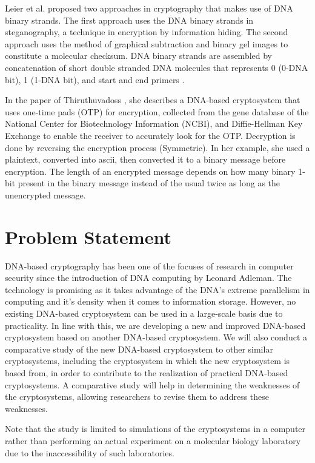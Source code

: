 Leier et al. proposed two approaches in cryptography that makes use of DNA binary strands. The first approach uses the DNA binary strands in steganography, a technique in encryption by information hiding. The second approach uses the method of graphical subtraction and binary gel images to constitute a molecular checksum. DNA binary strands are assembled by concatenation of short double stranded DNA molecules that represents 0 (0-DNA bit), 1 (1-DNA bit), and start and end primers \cite{leier}.

In the paper of Thiruthuvadoss \cite{mastersangeline}, she describes a DNA-based cryptosystem that uses one-time pads (OTP) for encryption, collected from the gene database of the National Center for Biotechnology Information (NCBI), and Diffie-Hellman Key Exchange to enable the receiver to accurately look for the OTP. Decryption is done by reversing the encryption process (Symmetric). In her example, she used a plaintext, converted into ascii, then converted it to a binary message before encryption. The length of an encrypted message depends on how many binary 1-bit present in the binary message instead of the usual twice as long as the unencrypted message.

\section{Problem Statement}

DNA-based cryptography has been one of the focuses of research in computer security since the introduction of DNA computing by Leonard Adleman.  The technology is promising as it takes advantage of the DNA's extreme parallelism in computing and it's density when it comes to information storage. However, no existing DNA-based cryptosystem can be used in a large-scale basis due to practicality. In line with this, we are developing a new and improved DNA-based cryptosystem based on another DNA-based cryptosystem. We will also conduct a comparative study of the new DNA-based cryptosystem to other similar cryptosystems, including the cryptosystem in which the new cryptosystem is based from, in order to contribute to the realization of practical DNA-based cryptosystems. A comparative study will help in determining the weaknesses of the cryptosystems, allowing researchers to revise them to address these weaknesses.

Note that the study is limited to simulations of the cryptosystems in a computer rather than performing an actual experiment on a molecular biology laboratory due to the inaccessibility of such laboratories.

